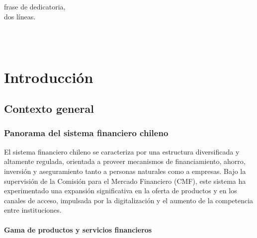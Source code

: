 \documentclass[
	spanish, %
	letterpaper, oneside
]{book}
\begin{document}
\templatePortrait

\templatePagecfg

\begin{abstractd}

\end{abstractd}

\begin{dedicatory}

	frase de dedicatoria, \\
	dos líneas. \\

	~
\end{dedicatory}

\begin{acknowledgments}
	~
\end{acknowledgments}

\templateIndex

\templateFinalcfg


\chapter{Introducción}

\section{Contexto general}

\subsection{Panorama del sistema financiero chileno}


El sistema financiero chileno se caracteriza por una estructura diversificada y altamente regulada, orientada a proveer mecanismos de financiamiento, ahorro, inversión y aseguramiento tanto a personas naturales como a empresas. Bajo la supervisión de la Comisión para el Mercado Financiero (CMF), este sistema ha experimentado una expansión significativa en la oferta de productos y en los canales de acceso, impulsada por la digitalización y el aumento de la competencia entre instituciones.


\subsubsection{Gama de productos y servicios financieros}
\end{document}
